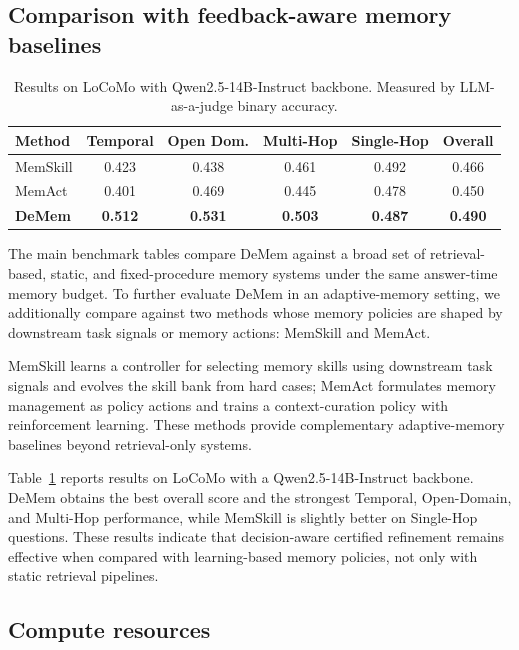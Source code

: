 \documentclass{article}
\theoremstyle{plain}
\theoremstyle{definition}
\theoremstyle{remark}
\begin{document}
\subsection{Comparison with feedback-aware memory baselines}
\label{app:feedback-aware-baselines}
\begin{table}[t]
\centering
\caption{Results on LoCoMo with Qwen2.5-14B-Instruct backbone. Measured by LLM-as-a-judge binary accuracy.}
\label{tab:locomo_qwen_feedbackaware}
\begin{tabular}{lccccc}
\toprule
Method & Temporal & Open Dom. & Multi-Hop & Single-Hop & Overall \\
\midrule
MemSkill   & 0.423 & 0.438 & 0.461 & 0.492 & 0.466 \\
MemAct     & 0.401 & 0.469 & 0.445 & 0.478 & 0.450 \\
\textbf{DeMem} 
           & \textbf{0.512} 
           & \textbf{0.531} 
           & \textbf{0.503} 
           & \textbf{0.487} 
           & \textbf{0.490} \\
\bottomrule
\end{tabular}
\end{table}
The main benchmark tables compare DeMem against a broad set of retrieval-based,
static, and fixed-procedure memory systems under the same answer-time memory
budget. To further evaluate DeMem in an adaptive-memory setting, we additionally
compare against two methods whose memory policies are shaped by downstream task
signals or memory actions: MemSkill and MemAct.

MemSkill learns a controller for selecting memory skills using downstream task
signals and evolves the skill bank from hard cases; MemAct formulates memory
management as policy actions and trains a context-curation policy with
reinforcement learning. These methods provide complementary adaptive-memory
baselines beyond retrieval-only systems.

Table~\ref{tab:locomo_qwen_feedbackaware} reports results on LoCoMo with a
Qwen2.5-14B-Instruct backbone. DeMem obtains the best overall score and the
strongest Temporal, Open-Domain, and Multi-Hop performance, while MemSkill is
slightly better on Single-Hop questions. These results indicate that
decision-aware certified refinement remains effective when compared with
learning-based memory policies, not only with static retrieval pipelines.

\subsection{Compute resources}
\label{app:compute-resources}
\end{document}

